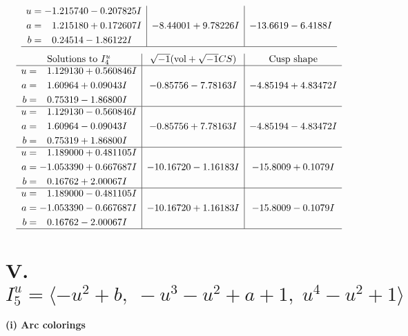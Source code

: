 \documentclass[1p]{elsarticle_modified}
\theoremstyle{definition}
\newcommand{\I}{\sqrt{-1}}
\begin{document}
$$\begin{array}{c|c|c}
\begin{aligned}
u &= -1.215740 - 0.207825 I \\
a &= \phantom{-}1.215180 + 0.172607 I \\
b &= \phantom{-}0.24514 - 1.86122 I\end{aligned}
 & -8.44001 + 9.78226 I & -13.6619 - 6.4188 I\\
 \hline 
 \end{array}$$\newpage$$\begin{array}{c|c|c}  
\text{Solutions to }I^u_{4}& \I (\text{vol} + \sqrt{-1}CS) & \text{Cusp shape}\\
 \hline 
\begin{aligned}
u &= \phantom{-}1.129130 + 0.560846 I \\
a &= \phantom{-}1.60964 + 0.09043 I \\
b &= \phantom{-}0.75319 - 1.86800 I\end{aligned}
 & -0.85756 - 7.78163 I & -4.85194 + 4.83472 I \\ \hline\begin{aligned}
u &= \phantom{-}1.129130 - 0.560846 I \\
a &= \phantom{-}1.60964 - 0.09043 I \\
b &= \phantom{-}0.75319 + 1.86800 I\end{aligned}
 & -0.85756 + 7.78163 I & -4.85194 - 4.83472 I \\ \hline\begin{aligned}
u &= \phantom{-}1.189000 + 0.481105 I \\
a &= -1.053390 + 0.667687 I \\
b &= \phantom{-}0.16762 + 2.00067 I\end{aligned}
 & -10.16720 - 1.16183 I & -15.8009 + 0.1079 I \\ \hline\begin{aligned}
u &= \phantom{-}1.189000 - 0.481105 I \\
a &= -1.053390 - 0.667687 I \\
b &= \phantom{-}0.16762 - 2.00067 I\end{aligned}
 & -10.16720 + 1.16183 I & -15.8009 - 0.1079 I\\
 \hline 
 \end{array}$$\newpage\newpage\renewcommand{\arraystretch}{1}
\centering \section*{V. $I^u_{5}= \langle - u^2+b,\;- u^3- u^2+a+1,\;u^4- u^2+1 \rangle$}
\flushleft \textbf{(i) Arc colorings}\\
\end{document}
